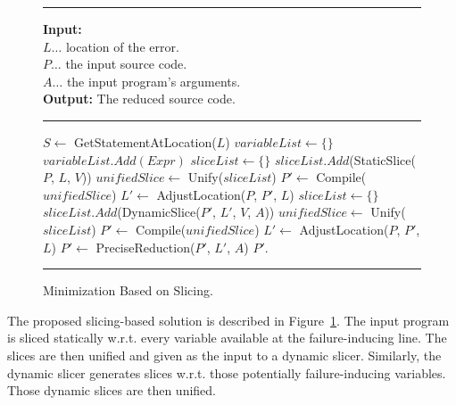\begin{figure}[h]
	\hrule height.8pt depth0pt \kern2pt
	\textbf{Input:} \\
	\hspace*{\algorithmicindent} $L \ldots$ location of the error. \\
	\hspace*{\algorithmicindent} $P \ldots$ the input source code. \\
	\hspace*{\algorithmicindent} $A \ldots$ the input program's arguments. \\
	\textbf{Output:} The reduced source code. 
	\hrule height.8pt depth0pt \kern2pt
	\begin{algorithmic}[1]
		\State $S \leftarrow$ GetStatementAtLocation($L$)
		\State $variableList \leftarrow \{\}$
				\State $variableList.Add(Expr)$
			\EndIf
		\EndFor
		\State $sliceList \leftarrow \{\}$
			\State $sliceList.Add$(StaticSlice($P$, $L$, $V$))
		\EndFor
		\State $unifiedSlice \leftarrow$ Unify($sliceList$)
		\State $P' \leftarrow$ Compile($unifiedSlice$)
		\State $L' \leftarrow$ AdjustLocation($P$, $P'$, $L$)
		\State $sliceList \leftarrow \{\}$
			\State $sliceList.Add$(DynamicSlice($P'$, $L'$, $V$, $A$))
		\EndFor
		\State $unifiedSlice \leftarrow$ Unify($sliceList$)
		\State $P' \leftarrow$ Compile($unifiedSlice$)
		\State $L' \leftarrow$ AdjustLocation($P$, $P'$, $L$)
		\State $P' \leftarrow$ PreciseReduction($P'$, $L'$, $A$)
		\State \Return $P'$.
	\end{algorithmic} 
	\hrule height.8pt depth0pt \kern2pt
	\caption{Minimization Based on Slicing.} 
	\label{alg:slicing}
\end{figure}

The proposed slicing-based solution is described in Figure~\ref{alg:slicing}.
The input program is sliced statically w.r.t.
every variable available at the failure-inducing line.
The slices are then unified and given as the input to a dynamic slicer.
Similarly, the dynamic slicer generates slices w.r.t.
those potentially failure-inducing variables.
Those dynamic slices are then unified.


